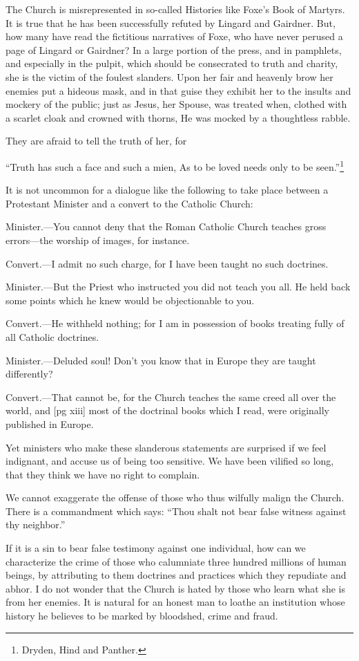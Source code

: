 The Church is misrepresented in so-called Histories
like Foxe's Book of Martyrs. It is true that
he has been successfully refuted by Lingard and
Gairdner. But, how many have read the fictitious
narratives of Foxe, who have never perused a page
of Lingard or Gairdner? In a large portion of
the press, and in pamphlets, and especially in the
pulpit, which should be consecrated to truth and
charity, she is the victim of the foulest slanders.
Upon her fair and heavenly brow her enemies put
a hideous mask, and in that guise they exhibit her
to the insults and mockery of the public; just as
Jesus, her Spouse, was treated when, clothed with
a scarlet cloak and crowned with thorns, He was
mocked by a thoughtless rabble.

They are afraid to tell the truth of her, for

“Truth has such a face and such a mien,
As to be loved needs only to be seen.”\footnote{Dryden,
Hind and Panther.}

It is not uncommon for a dialogue like the following
to take place between a Protestant Minister
and a convert to the Catholic Church:

Minister.—You cannot deny that the Roman
Catholic Church teaches gross errors—the worship
of images, for instance.

Convert.—I admit no such charge, for I have
been taught no such doctrines.

Minister.—But the Priest who instructed you
did not teach you all. He held back some points
which he knew would be objectionable to you.

Convert.—He withheld nothing; for I am in
possession of books treating fully of all Catholic
doctrines.

Minister.—Deluded soul! Don't you know that
in Europe they are taught differently?

Convert.—That cannot be, for the Church
teaches the same creed all over the world, and
[pg xiii]
most of the doctrinal books which I read, were
originally published in Europe.

Yet ministers who make these slanderous statements
are surprised if we feel indignant, and accuse
us of being too sensitive. We have been vilified
so long, that they think we have no right to
complain.

We cannot exaggerate the offense of those who
thus wilfully malign the Church. There is a commandment
which says: “Thou shalt not bear
false witness against thy neighbor.”

If it is a sin to bear false testimony against one
individual, how can we characterize the crime of
those who calumniate three hundred millions of
human beings, by attributing to them doctrines
and practices which they repudiate and abhor. I
do not wonder that the Church is hated by those
who learn what she is from her enemies. It is
natural for an honest man to loathe an institution
whose history he believes to be marked by bloodshed,
crime and fraud.

